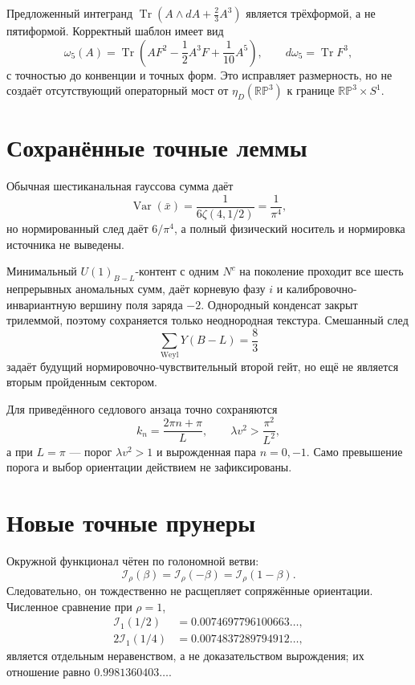 Предложенный интегранд
\(\operatorname{Tr}(A\wedge dA+\tfrac23A^3)\) является трёхформой, а не
пятиформой. Корректный шаблон имеет вид
\begin{equation}
 \omega_5(A)=\operatorname{Tr}
 \left(AF^2-\frac12A^3F+\frac1{10}A^5\right),
 \qquad d\omega_5=\operatorname{Tr}F^3,
\end{equation}
с точностью до конвенции и точных форм. Это исправляет размерность, но не
создаёт отсутствующий операторный мост от
\(\eta_D(\mathbb{RP}^3)\) к границе
\(\mathbb{RP}^3\times S^1\).

\section{Сохранённые точные леммы}

Обычная шестиканальная гауссова сумма даёт
\begin{equation}
 \operatorname{Var}(\bar x)
 =\frac1{6\zeta(4,1/2)}=\frac1{\pi^4},
\end{equation}
но нормированный след даёт \(6/\pi^4\), а полный физический носитель и
нормировка источника не выведены.

Минимальный \(U(1)_{B-L}\)-контент с одним \(N^c\) на поколение проходит
все шесть непрерывных аномальных сумм, даёт корневую фазу \(i\) и
калибровочно-инвариантную вершину поля заряда \(-2\). Однородный конденсат
закрыт трилеммой, поэтому сохраняется только неоднородная текстура.
Смешанный след
\begin{equation}
 \sum_{\mathrm{Weyl}}Y(B-L)=\frac83
\end{equation}
задаёт будущий нормировочно-чувствительный второй гейт, но ещё не является
вторым пройденным сектором.

Для приведённого седлового анзаца точно сохраняются
\begin{equation}
 k_n=\frac{2\pi n+\pi}{L},\qquad
 \lambda v^2>\frac{\pi^2}{L^2},
\end{equation}
а при \(L=\pi\) --- порог \(\lambda v^2>1\) и вырожденная пара
\(n=0,-1\). Само превышение порога и выбор ориентации действием не
зафиксированы.

\section{Новые точные прунеры}

Окружной функционал чётен по голономной ветви:
\begin{equation}
 \mathcal I_\rho(\beta)=\mathcal I_\rho(-\beta)
 =\mathcal I_\rho(1-\beta).
\end{equation}
Следовательно, он тождественно не расщепляет сопряжённые ориентации.
Численное сравнение при \(\rho=1\),
\begin{align}
 \mathcal I_1(1/2)&=0.0074697796100663\ldots,\\
 2\mathcal I_1(1/4)&=0.0074837289794912\ldots,
\end{align}
является отдельным неравенством, а не доказательством вырождения; их
отношение равно \(0.9981360403\ldots\).

